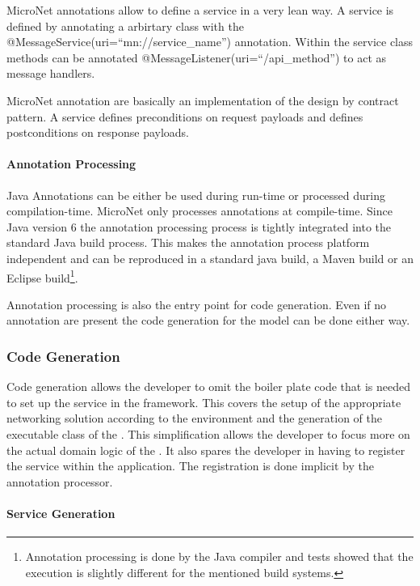 MicroNet annotations allow to define a service in a very lean way. A service is
defined by annotating a arbirtary class with the
@MessageService(uri=``mn://service\_name'') annotation. Within the service class
methods can be annotated @MessageListener(uri=``/api\_method'') to act as
message handlers. 

MicroNet annotation are basically an implementation of the design by contract
pattern. A service defines preconditions on request payloads and
defines postconditions on response payloads.
 
 \paragraph{Annotation Processing}
 
Java Annotations can be either be used during run-time or processed during
compilation-time. MicroNet only processes annotations at compile-time. Since
Java version 6 the annotation processing process is tightly integrated into the
standard Java build process. This makes the annotation process platform
independent and can be reproduced in a standard java build, a Maven build or an
Eclipse build\footnote{Annotation processing is done by the Java compiler and
tests showed that the execution is slightly different for the mentioned build
systems.}.

Annotation processing is also the entry point for code generation. Even if no
annotation are present the code generation for the model can be done either way.

\subsubsection{Code Generation}

Code generation allows the developer to omit  the boiler plate code that is
needed to set up the service in the framework. This covers the setup of the
appropriate networking solution according to the environment and the generation
of the executable class of the \ms{}. This simplification allows the developer
to focus more on the actual domain logic of the \ms{}. It also spares the
developer in having to register the service within the application. The
registration is done implicit by the annotation processor.

\paragraph{Service Generation}

